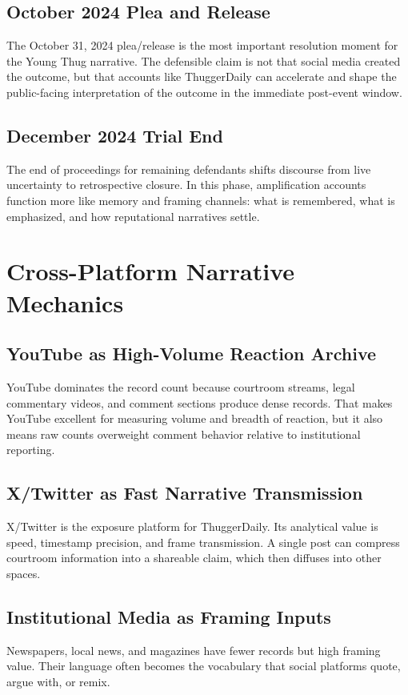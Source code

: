 \documentclass[12pt]{article}
\begin{document}
\subsection{October 2024 Plea and Release}
The October 31, 2024 plea/release is the most important resolution moment for the Young Thug narrative. The defensible claim is not that social media created the outcome, but that accounts like ThuggerDaily can accelerate and shape the public-facing interpretation of the outcome in the immediate post-event window.

\subsection{December 2024 Trial End}
The end of proceedings for remaining defendants shifts discourse from live uncertainty to retrospective closure. In this phase, amplification accounts function more like memory and framing channels: what is remembered, what is emphasized, and how reputational narratives settle.

\newpage
\section{Cross-Platform Narrative Mechanics}
\subsection{YouTube as High-Volume Reaction Archive}
YouTube dominates the record count because courtroom streams, legal commentary videos, and comment sections produce dense records. That makes YouTube excellent for measuring volume and breadth of reaction, but it also means raw counts overweight comment behavior relative to institutional reporting.

\subsection{X/Twitter as Fast Narrative Transmission}
X/Twitter is the exposure platform for ThuggerDaily. Its analytical value is speed, timestamp precision, and frame transmission. A single post can compress courtroom information into a shareable claim, which then diffuses into other spaces.

\subsection{Institutional Media as Framing Inputs}
Newspapers, local news, and magazines have fewer records but high framing value. Their language often becomes the vocabulary that social platforms quote, argue with, or remix.
\end{document}
